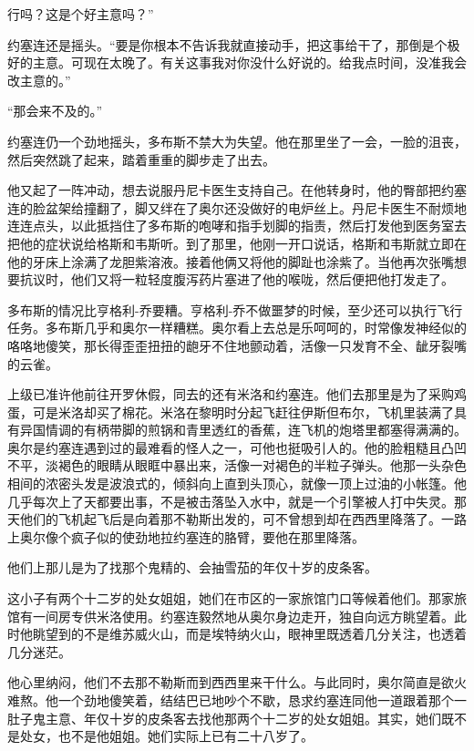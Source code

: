     行吗？这是个好主意吗？”

    约塞连还是摇头。“要是你根本不告诉我就直接动手，把这事给干了，那倒是个极好的主意。可现在太晚了。有关这事我对你没什么好说的。给我点时间，没准我会改主意的。”

    “那会来不及的。”

    约塞连仍一个劲地摇头，多布斯不禁大为失望。他在那里坐了一会，一脸的沮丧，然后突然跳了起来，踏着重重的脚步走了出去。

    他又起了一阵冲动，想去说服丹尼卡医生支持自己。在他转身时，他的臀部把约塞连的脸盆架给撞翻了，脚又绊在了奥尔还没做好的电炉丝上。丹尼卡医生不耐烦地连连点头，以此抵挡住了多布斯的咆哮和指手划脚的指责，然后打发他到医务室去把他的症状说给格斯和韦斯听。到了那里，他刚一开口说话，格斯和韦斯就立即在他的牙床上涂满了龙胆紫溶液。接着他俩又将他的脚趾也涂紫了。当他再次张嘴想要抗议时，他们又将一粒轻度腹泻药片塞进了他的喉咙，然后便把他打发走了。
 


    多布斯的情况比亨格利-乔要糟。亨格利-乔不做噩梦的时候，至少还可以执行飞行任务。多布斯几乎和奥尔一样糟糕。奥尔看上去总是乐呵呵的，时常像发神经似的咯咯地傻笑，那长得歪歪扭扭的龅牙不住地颤动着，活像一只发育不全、龇牙裂嘴的云雀。

    上级已准许他前往开罗休假，同去的还有米洛和约塞连。他们去那里是为了采购鸡蛋，可是米洛却买了棉花。米洛在黎明时分起飞赶往伊斯但布尔，飞机里装满了具有异国情调的有柄带脚的煎锅和青里透红的香蕉，连飞机的炮塔里都塞得满满的。奥尔是约塞连遇到过的最难看的怪人之一，可他也挺吸引人的。他的脸粗糙且凸凹不平，淡褐色的眼睛从眼眶中暴出来，活像一对褐色的半粒子弹头。他那一头杂色相间的浓密头发是波浪式的，倾斜向上直到头顶心，就像一顶上过油的小帐篷。他几乎每次上了天都要出事，不是被击落坠入水中，就是一个引擎被人打中失灵。那天他们的飞机起飞后是向着那不勒斯出发的，可不曾想到却在西西里降落了。一路上奥尔像个疯子似的使劲地拉约塞连的胳臂，要他在那里降落。

    他们上那儿是为了找那个鬼精的、会抽雪茄的年仅十岁的皮条客。

    这小子有两个十二岁的处女姐姐，她们在市区的一家旅馆门口等候着他们。那家旅馆有一间房专供米洛使用。约塞连毅然地从奥尔身边走开，独自向远方眺望着。此时他眺望到的不是维苏威火山，而是埃特纳火山，眼神里既透着几分关注，也透着几分迷茫。

    他心里纳闷，他们不去那不勒斯而到西西里来干什么。与此同时，奥尔简直是欲火难熬。他一个劲地傻笑着，结结巴已地吵个不歇，恳求约塞连同他一道跟着那个一肚子鬼主意、年仅十岁的皮条客去找他那两个十二岁的处女姐姐。其实，她们既不是处女，也不是他姐姐。她们实际上已有二十八岁了。


